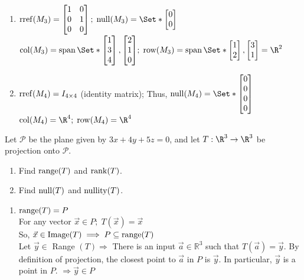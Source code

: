 \begin{exercises}
\begin{problist}
\begin{solution}
\begin{enumerate}
    		    \item $\rref(M_3)=\mat{1&0\\0&1\\0&0};\; \Null(M_3)=\Set*{\mat{0\\0}}$\\
    		    $\Col(M_3)=\Span\Set*{\mat{1\\3\\4},\mat{2\\1\\0}};\; \Row(M_3)=\Span\Set*{\mat{1\\2},\mat{3\\1}}=\R^2$
    		    
    		    \item $\operatorname{rref}(M_4)=I_{4\times4}$ (identity matrix); Thus, $\Null(M_4)=\Set*{\mat{0\\0\\0\\0}}$\\
    		    $\Col(M_4)=\R^4; \; \Row(M_4)=\R^4$
		    \end{enumerate}
		\end{solution}

		\prob Let $\mathcal P$ be the plane given by $3x+4y+5z=0$, and
		let $T:\R^{3}\to\R^{3}$ be projection onto $\mathcal P$.
		\begin{enumerate}
			\item Find $\operatorname{range}(T)$ and $\operatorname{rank}(T)$.

			\item Find $\operatorname{null}(T)$ and $\operatorname{nullity}(T)$.
		\end{enumerate}

        \begin{solution}
            \begin{enumerate}
                 \item $\operatorname{range}(T)=P$\\
    		    For any vector $\vec x \in P; \; T(\vec x) = \vec x$\\
    		    So, $\vec x\in \text{Image}(T) \implies P \subseteq \operatorname{range}(T)$\\
    		    
    		    Let \(\vec{y} \in\) Range \((T) \Rightarrow\) There is an input \(\vec{a} \in \mathbb{R}^{3}\) such that \(T(\vec{a})=\vec{y}\).
                By definition of projection, the closest point to \(\vec{a}\) in \(P\) is \(\vec{y}\).
                In particular, \(\vec{y}\) is a point in \(P\). \(\Rightarrow \vec{y} \in P\)\\
                

\end{enumerate}
\end{solution}
\end{problist}
\end{exercises}
